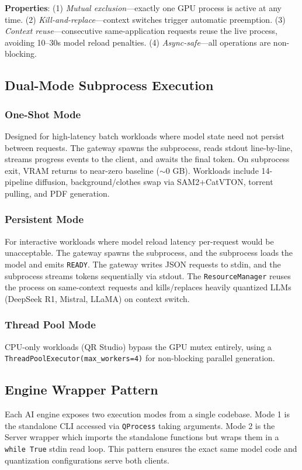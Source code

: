 \documentclass[conference]{IEEEtran}
\begin{document}
\textbf{Properties}: (1) \textit{Mutual exclusion}---exactly one GPU process is active at any time. (2) \textit{Kill-and-replace}---context switches trigger automatic preemption. (3) \textit{Context reuse}---consecutive same-application requests reuse the live process, avoiding 10--30s model reload penalties. (4) \textit{Async-safe}---all operations are non-blocking.

\subsection{Dual-Mode Subprocess Execution}

\subsubsection{One-Shot Mode}
Designed for high-latency batch workloads where model state need not persist between requests. The gateway spawns the subprocess, reads stdout line-by-line, streams progress events to the client, and awaits the final token. On subprocess exit, VRAM returns to near-zero baseline ($\sim$0 GB). Workloads include 14-pipeline diffusion, background/clothes swap via SAM2+CatVTON, torrent pulling, and PDF generation.

\subsubsection{Persistent Mode}
For interactive workloads where model reload latency per-request would be unacceptable. The gateway spawns the subprocess, and the subprocess loads the model and emits \texttt{READY}. The gateway writes JSON requests to stdin, and the subprocess streams tokens sequentially via stdout. The \texttt{ResourceManager} reuses the process on same-context requests and kills/replaces heavily quantized LLMs (DeepSeek R1, Mistral, LLaMA) on context switch.

\subsubsection{Thread Pool Mode}
CPU-only workloads (QR Studio) bypass the GPU mutex entirely, using a \texttt{ThreadPoolExecutor(max\_workers=4)} for non-blocking parallel generation.

\subsection{Engine Wrapper Pattern}
Each AI engine exposes two execution modes from a single codebase. Mode 1 is the standalone CLI accessed via \texttt{QProcess} taking arguments. Mode 2 is the Server wrapper which imports the standalone functions but wraps them in a \texttt{while True} stdin read loop. This pattern ensures the exact same model code and quantization configurations serve both clients.
\end{document}
